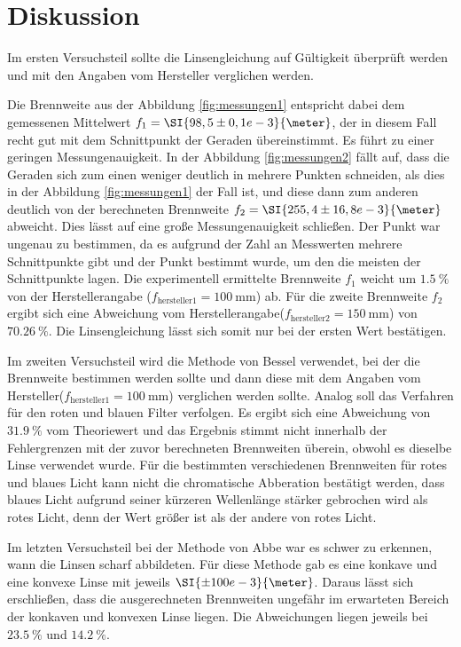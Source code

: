 \section{Diskussion}
\label{sec:Diskussion}
Im ersten Versuchsteil sollte die Linsengleichung auf Gültigkeit überprüft werden und mit den Angaben vom Hersteller verglichen werden.

Die Brennweite aus der Abbildung \ref{fig:messungen1} entspricht dabei dem gemessenen Mittelwert $f_1 = \SI{98,5 \pm 0,1 e-3}{\meter}$, der in diesem Fall recht gut mit dem Schnittpunkt der Geraden übereinstimmt. Es führt zu einer geringen Messungenauigkeit. In der Abbildung \ref{fig:messungen2} fällt auf, dass die Geraden sich zum einen weniger deutlich in mehrere Punkten schneiden, als dies in der Abbildung \ref{fig:messungen1} der Fall ist, und diese dann zum anderen deutlich von der berechneten Brennweite $f_2 = \SI{255,4 \pm 16,8 e-3}{\meter}$ abweicht. Dies lässt auf eine große Messungenauigkeit schließen. Der Punkt war ungenau zu bestimmen, da es aufgrund der Zahl an Messwerten mehrere Schnittpunkte gibt und der Punkt bestimmt wurde, um den die meisten der Schnittpunkte lagen.
Die experimentell ermittelte Brennweite $f_1$ weicht um $\SI{1,5}{\percent}$ von der Herstellerangabe ($f_\text{hersteller1} = \SI{100}{\milli\meter}$) ab. Für die zweite Brennweite $f_2$ ergibt sich eine Abweichung vom Herstellerangabe($f_\text{hersteller2} = \SI{150}{\milli\meter}$) von $\SI{70,26}{\percent}$. Die Linsengleichung lässt sich somit nur bei der ersten Wert bestätigen.

Im zweiten Versuchsteil wird die Methode von Bessel verwendet, bei der die Brennweite bestimmen werden sollte und dann diese mit dem Angaben vom Hersteller($f_\text{hersteller1} = \SI{100}{\milli\meter}$) verglichen werden sollte. Analog soll das Verfahren für den roten und blauen Filter verfolgen.
Es ergibt sich eine Abweichung von $\SI{31,9}{\percent}$ vom Theoriewert und das Ergebnis stimmt nicht innerhalb der Fehlergrenzen mit der zuvor berechneten Brennweiten überein, obwohl es dieselbe Linse verwendet wurde.
Für die bestimmten verschiedenen Brennweiten für rotes und blaues Licht kann nicht die chromatische Abberation bestätigt werden, dass blaues Licht aufgrund seiner kürzeren Wellenlänge stärker gebrochen wird als rotes Licht, denn der Wert größer ist als der andere von rotes Licht.

Im letzten Versuchsteil bei der Methode von Abbe war es schwer zu erkennen, wann die Linsen scharf abbildeten. Für diese Methode gab es eine konkave und eine konvexe Linse mit jeweils $\SI{\pm 100 e-3}{\meter}$. Daraus lässt sich erschließen, dass die ausgerechneten Brennweiten ungefähr im erwarteten Bereich der konkaven und konvexen Linse liegen. Die Abweichungen liegen jeweils bei $\SI{23,5}{\percent}$ und $\SI{14,2}{\percent}$.